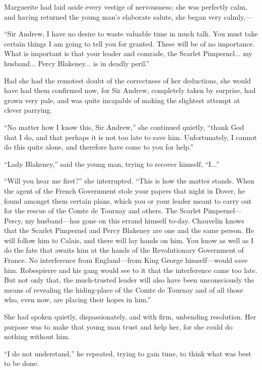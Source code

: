 \documentclass[paper=5.5in:8.5in,BCOR=7mm,twoside,DIV=calc,12pt,usegeometry,chapterprefix,endperiod,headings=big]{scrbook}
\begin{document}
Marguerite had laid aside every vestige of nervousness; she was perfectly calm, and having returned the young man's elaborate salute, she began very calmly,---

\enquote{Sir Andrew, I have no desire to waste valuable time in much talk. You must take certain things I am going to tell you for granted. These will be of no importance. What is important is that your leader and comrade, the Scarlet Pimpernel... my husband... Percy Blakeney... is in deadly peril.}

Had she had the remotest doubt of the correctness of her deductions, she would have had them confirmed now, for Sir Andrew, completely taken by surprise, had grown very pale, and was quite incapable of making the slightest attempt at clever parrying.

\enquote{No matter how I know this, Sir Andrew,} she continued quietly, \enquote{thank God that I do, and that perhaps it is not too late to save him. Unfortunately, I cannot do this quite alone, and therefore have come to you for help.}

\enquote{Lady Blakeney,} said the young man, trying to recover himself, \enquote{I...}

\enquote{Will you hear me first?} she interrupted. \enquote{This is how the matter stands. When the agent of the French Government stole your papers that night in Dover, he found amongst them certain plans, which you or your leader meant to carry out for the rescue of the Comte de Tournay and others. The Scarlet Pimpernel---Percy, my husband---has gone on this errand himself to-day. Chauvelin knows that the Scarlet Pimpernel and Percy Blakeney are one and the same person. He will follow him to Calais, and there will lay hands on him. You know as well as I do the fate that awaits him at the hands of the Revolutionary Government of France. No interference from England---from King George himself---would save him. Robespierre and his gang would see to it that the interference came too late. But not only that, the much-trusted leader will also have been unconsciously the means of revealing the hiding-place of the Comte de Tournay and of all those who, even now, are placing their hopes in him.}

She had spoken quietly, dispassionately, and with firm, unbending resolution. Her purpose was to make that young man trust and help her, for she could do nothing without him.

\enquote{I do not understand,} he repeated, trying to gain time, to think what was best to be done.
\end{document}
